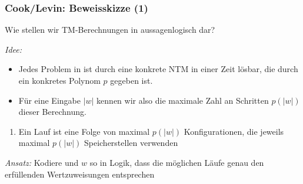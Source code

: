\documentclass[aspectratio=1610,onlymath]{beamer}
\begin{document}
\begin{frame}\frametitle{Cook/Levin: Beweisskizze (1)}

\alert{Wie stellen wir TM-Berechnungen in aussagenlogisch dar?}
\bigskip

\emph{Idee:}
\begin{itemize}
\item Jedes Problem in  ist durch eine konkrete NTM  in einer Zeit lösbar, die durch ein konkretes Polynom $p$ gegeben ist.
\item Für eine Eingabe $|w|$ kennen wir also die maximale Zahl an Schritten $p(|w|)$ dieser Berechnung.
\end{itemize}
\begin{enumerate}[$\leadsto$]
\item Ein Lauf ist eine Folge von maximal $p(|w|)$ Konfigurationen, die jeweils maximal $p(|w|)$ Speicherstellen verwenden
\end{enumerate}
\bigskip

\emph{Ansatz:} Kodiere  und $w$ so in Logik, dass die möglichen Läufe genau den erfüllenden Wertzuweisungen entsprechen

\end{frame}
\end{document}
